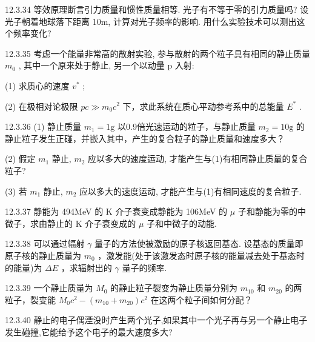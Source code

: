 \begin{problem}{12.3.34}
等效原理断言引力质量和惯性质量相等. 光子有不等于零的引力质量吗? 设光子朝着地球落下距离 10m, 计算对光子频率的影响. 用什么实验技术可以测出这个频率变化?
\end{problem}
\clearpage


\begin{problem}{12.3.35}
考虑一个能量非常高的散射实验, 参与散射的两个粒子具有相同的静止质量 $m_{0}$ , 其中一个原来处于静止, 另一个以动量 p 入射:

(1) 求质心的速度 $v^{*}$ ;

(2) 在极相对论极限 $pc \gg m_{0}c^{2}$ 下，求此系统在质心平动参考系中的总能量 $E^{*}$ .
\end{problem}
\clearpage


\begin{problem}{12.3.36}
(1) 静止质量 $m_{1} = 1\mathrm{g}$ 以0.9倍光速运动的粒子，与静止质量 $m_{2} = 10\mathrm{g}$ 的静止粒子发生正碰，并嵌入其中，产生的复合粒子的静止质量和速度多大？

(2) 假定 $m_{1}$ 静止, $m_{2}$ 应以多大的速度运动, 才能产生与(1)有相同静止质量的复合粒子?

(3) 若 $m_{1}$ 静止, $m_{2}$ 应以多大的速度运动, 才能产生与(1)有相同速度的复合粒子.
\end{problem}
\clearpage


\begin{problem}{12.3.37}
静能为 494MeV 的 K 介子衰变成静能为 106MeV 的 $\mu$ 子和静能为零的中微子，求由静止的 K 介子衰变成的 $\mu$ 子和中微子的动能.
\end{problem}
\clearpage


\begin{problem}{12.3.38}
可以通过辐射 $\gamma$ 量子的方法使被激励的原子核返回基态. 设基态的质量即原子核的静止质量为 $m_{0}$ ，激发能(处于该激发态时原子核的能量减去处于基态时的能量)为 $\Delta E$ ，求辐射出的 $\gamma$ 量子的频率.
\end{problem}
\clearpage


\begin{problem}{12.3.39}
一个静止质量为 $M_0$ 的静止粒子裂变为静止质量分别为 $m_{10}$ 和 $m_{20}$ 的两粒子，裂变能 $M_0c^2 - (m_{10} + m_{20})c^2$ 在这两个粒子间如何分配？
\end{problem}
\clearpage


\begin{problem}{12.3.40}
静止的电子偶湮没时产生两个光子,如果其中一个光子再与另一个静止电子发生碰撞,它能给予这个电子的最大速度多大?
\end{problem}
\clearpage


